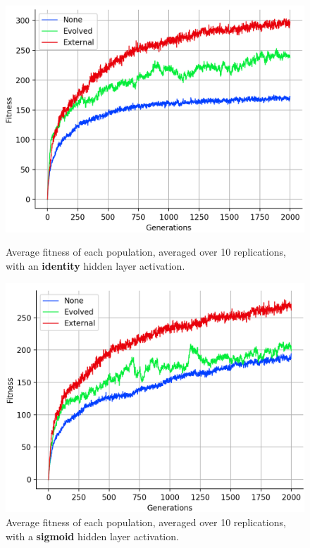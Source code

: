 \documentclass[12pt,a4paper]{report}
\begin{document}
\begin{figure}[t]
   \centering
   \begin{minipage}{0.49\textwidth}
          \centering
          \captionsetup{width=.9\linewidth}
          \includegraphics[width=1.\linewidth]{results/average-identity.png}
          \caption{Average fitness of each population, averaged over 10 replications, with an {\bf identity} hidden layer activation.}
          \label{fig:average-identity}
   \end{minipage}
   \begin{minipage}{0.49\textwidth}
          \centering
          \captionsetup{width=.9\linewidth}
          \includegraphics[width=1.\linewidth]{results/average-sigmoid.png}
          \caption{Average fitness of each population, averaged over 10 replications, with a {\bf sigmoid} hidden layer activation.}
          \label{fig:average-sigmoid}
   \end{minipage}
\end{figure}
\end{document}
